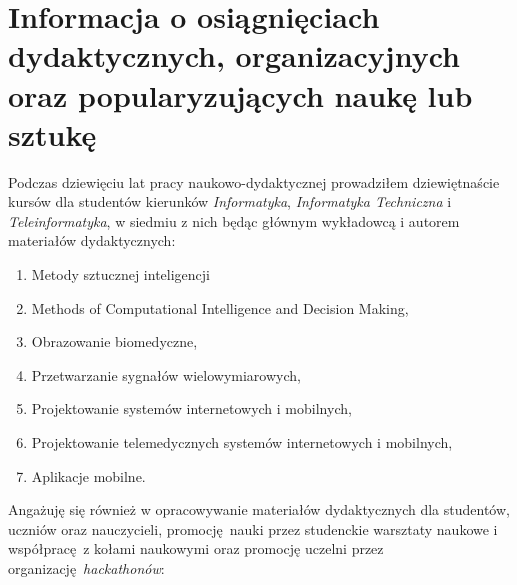 
\section{Informacja o osiągnięciach dydaktycznych, organizacyjnych oraz popularyzujących naukę lub sztukę}

Podczas dziewięciu lat pracy naukowo-dydaktycznej prowadziłem dziewiętnaście kursów dla studentów kierunków \emph{Informatyka}, \emph{Informatyka Techniczna} i \emph{Teleinformatyka}, w siedmiu z nich będąc głównym wykładowcą i autorem materiałów dydaktycznych: 

\begin{enumerate}
	\item Metody sztucznej inteligencji%
	\item Methods of Computational Intelligence and Decision Making,%
	\item Obrazowanie biomedyczne,%
	\item Przetwarzanie sygnałów wielowymiarowych,%
	\item Projektowanie systemów internetowych i mobilnych,%
	\item Projektowanie telemedycznych systemów internetowych i mobilnych,%
	\item Aplikacje mobilne.%
\end{enumerate}

Angażuję się również w opracowywanie materiałów dydaktycznych dla studentów, uczniów oraz nauczycieli, promocję nauki przez studenckie warsztaty naukowe i współpracę z kołami naukowymi oraz promocję uczelni przez organizację \emph{hackathonów}:

